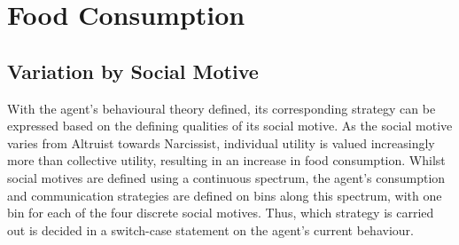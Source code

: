 







\section{Food Consumption}\label{food_consumption}

\subsection{Variation by Social Motive}
With the agent's behavioural theory defined, its corresponding strategy can be expressed based on the defining qualities of its social motive. As the social motive varies from Altruist towards Narcissist, individual utility is valued increasingly more than collective utility, resulting in an increase in food consumption. Whilst social motives are defined using a continuous spectrum, the agent’s consumption and communication strategies are defined on bins along this spectrum, with one bin for each of the four discrete social motives. Thus, which strategy is carried out is decided in a switch-case statement on the agent's current behaviour.



